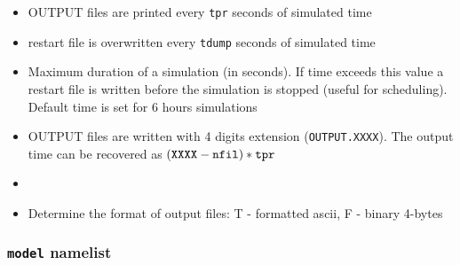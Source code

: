\begin{itemize}
\item
{}
{OUTPUT files are printed every {\tt tpr} seconds of simulated time}

\item
{}
{restart file is overwritten every {\tt tdump} seconds of simulated time}

\item
{}
{Maximum duration of a simulation (in seconds). If time exceeds this value
a restart file is written before the simulation is stopped (useful for
scheduling). Default time is set for 6 hours simulations}

\item
{}
{OUTPUT files are written with 4 digits extension ({\tt OUTPUT.XXXX}). 
The output time can be recovered as $({\tt XXXX - nfil})* {\tt tpr}$ }

\item
{}
{}

\item
{}
{Determine the format of output files: T - formatted ascii, 
F - binary 4-bytes }

\end{itemize}

\subsubsection{{\tt model} namelist}

